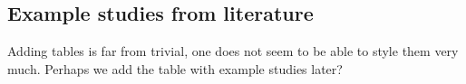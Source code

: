 \subsection{Example studies from literature}

Adding tables is far from trivial, one does not seem to be able to style them very much. Perhaps we add the table with example studies later?